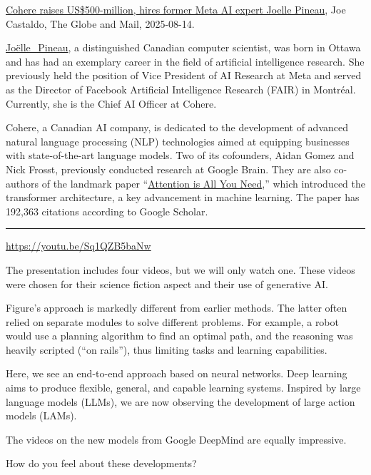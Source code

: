 \documentclass[
  letterpaper,
  DIV=11,
  numbers=noendperiod]{scrartcl}
\begin{document}
\href{https://www.theglobeandmail.com/business/article-cohere-fundraising-former-meta-executive-joelle-pineau-ai/}{Cohere
raises US\$500-million, hires former Meta AI expert Joelle Pineau}, Joe
Castaldo, The Globe and Mail, 2025-08-14.

\href{https://en.wikipedia.org/wiki/Joëlle_Pineau}{Joëlle\_Pineau}, a
distinguished Canadian computer scientist, was born in Ottawa and has
had an exemplary career in the field of artificial intelligence
research. She previously held the position of Vice President of AI
Research at Meta and served as the Director of Facebook Artificial
Intelligence Research (FAIR) in Montréal. Currently, she is the Chief AI
Officer at Cohere.

Cohere, a Canadian AI company, is dedicated to the development of
advanced natural language processing (NLP) technologies aimed at
equipping businesses with state-of-the-art language models. Two of its
cofounders, Aidan Gomez and Nick Frosst, previously conducted research
at Google Brain. They are also co-authors of the landmark paper
``\href{https://arxiv.org/abs/1706.03762}{Attention is All You Need},''
which introduced the transformer architecture, a key advancement in
machine learning. The paper has 192,363 citations according to Google
Scholar.

\begin{center}\rule{0.5\linewidth}{0.5pt}\end{center}

\url{https://youtu.be/Sq1QZB5baNw}

The presentation includes four videos, but we will only watch one. These
videos were chosen for their science fiction aspect and their use of
generative AI.

Figure's approach is markedly different from earlier methods. The latter
often relied on separate modules to solve different problems. For
example, a robot would use a planning algorithm to find an optimal path,
and the reasoning was heavily scripted (``on rails''), thus limiting
tasks and learning capabilities.

Here, we see an end-to-end approach based on neural networks. Deep
learning aims to produce flexible, general, and capable learning
systems. Inspired by large language models (LLMs), we are now observing
the development of large action models (LAMs).

The videos on the new models from Google DeepMind are equally
impressive.

How do you feel about these developments?
\end{document}
